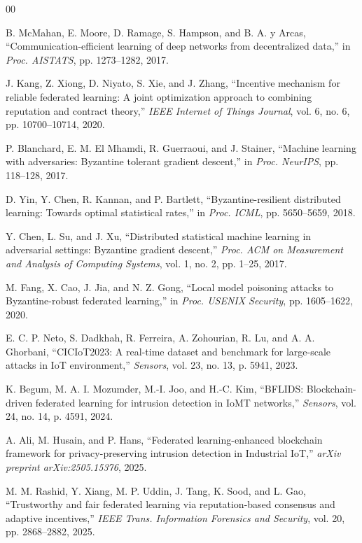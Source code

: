 \documentclass[conference]{IEEEtran}
\begin{document}
\begin{thebibliography}{00}

B. McMahan, E. Moore, D. Ramage, S. Hampson, and B. A. y Arcas, ``Communication-efficient learning of deep networks from decentralized data,'' in \emph{Proc. AISTATS}, pp. 1273--1282, 2017.

J. Kang, Z. Xiong, D. Niyato, S. Xie, and J. Zhang, ``Incentive mechanism for reliable federated learning: A joint optimization approach to combining reputation and contract theory,'' \emph{IEEE Internet of Things Journal}, vol. 6, no. 6, pp. 10700--10714, 2020.

P. Blanchard, E. M. El Mhamdi, R. Guerraoui, and J. Stainer, ``Machine learning with adversaries: Byzantine tolerant gradient descent,'' in \emph{Proc. NeurIPS}, pp. 118--128, 2017.

D. Yin, Y. Chen, R. Kannan, and P. Bartlett, ``Byzantine-resilient distributed learning: Towards optimal statistical rates,'' in \emph{Proc. ICML}, pp. 5650--5659, 2018.

Y. Chen, L. Su, and J. Xu, ``Distributed statistical machine learning in adversarial settings: Byzantine gradient descent,'' \emph{Proc. ACM on Measurement and Analysis of Computing Systems}, vol. 1, no. 2, pp. 1--25, 2017.

M. Fang, X. Cao, J. Jia, and N. Z. Gong, ``Local model poisoning attacks to Byzantine-robust federated learning,'' in \emph{Proc. USENIX Security}, pp. 1605--1622, 2020.

E. C. P. Neto, S. Dadkhah, R. Ferreira, A. Zohourian, R. Lu, and A. A. Ghorbani, ``CICIoT2023: A real-time dataset and benchmark for large-scale attacks in IoT environment,'' \emph{Sensors}, vol. 23, no. 13, p. 5941, 2023.

K. Begum, M. A. I. Mozumder, M.-I. Joo, and H.-C. Kim, ``BFLIDS: Blockchain-driven federated learning for intrusion detection in IoMT networks,'' \emph{Sensors}, vol. 24, no. 14, p. 4591, 2024.

A. Ali, M. Husain, and P. Hans, ``Federated learning-enhanced blockchain framework for privacy-preserving intrusion detection in Industrial IoT,'' \emph{arXiv preprint arXiv:2505.15376}, 2025.

M. M. Rashid, Y. Xiang, M. P. Uddin, J. Tang, K. Sood, and L. Gao, ``Trustworthy and fair federated learning via reputation-based consensus and adaptive incentives,'' \emph{IEEE Trans. Information Forensics and Security}, vol. 20, pp. 2868--2882, 2025.


\end{thebibliography}
\end{document}
